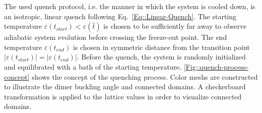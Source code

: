 	The used quench protocol, i.e. the manner in which the system is cooled down, is an isotropic, linear quench following Eq.~\eqref{Eq::Linear-Quench}. The starting temperature $\varepsilon(t_{start}) < \varepsilon(\hat{t})$ is chosen to be sufficiently far away to observe adiabatic system evolution before crossing the freeze-out point. The end temperature $\varepsilon(t_{end})$ is chosen in symmetric distance from the transition point $|\varepsilon(t_{start})|=|\varepsilon(t_{end})|$. Before the quench, the system is randomly initialized and equilibrated with a bath of the starting temperature. \autoref{Fig::quench-process-concept} shows the concept of the quenching process. Color meshs are constructed to illustrate the dimer buckling angle and connected domains. A checkerboard transformation is applied to the lattice values in order to visualize connected domains.  \\
	
